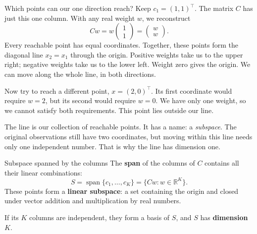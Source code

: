 \documentclass[a4paper,12pt,oneside]{report}
\begin{document}
\begin{framedexample}{Which points can our one direction reach?}
Keep $c_1=(1,1)^\top$. The matrix $C$ has just this one column.
With any real weight $w$, we reconstruct
\[
  Cw=w\begin{pmatrix}1\\1\end{pmatrix}
     =\begin{pmatrix}w\\w\end{pmatrix}.
\]
Every reachable point has equal coordinates. Together, these points
form the diagonal line $x_2=x_1$ through the origin.
Positive weights take us to the upper right; negative weights take
us to the lower left. Weight zero gives the origin. We can move
along the whole line, in both directions.

\begin{center}
\end{center}

Now try to reach a different point, $x=(2,0)^\top$.
Its first coordinate would require $w=2$, but its second would
require $w=0$. We have only one weight, so we cannot satisfy both
requirements. This point lies outside our line.
\end{framedexample}

The line is our collection of reachable points. It has a name:
a \emph{subspace}. The original observations still have two
coordinates, but moving within this line needs only one independent
number. That is why the line has dimension one.

\begin{frameddefn}{Subspace spanned by the columns}\label{def:column-subspace}
The \textbf{span} of the columns of $C$ contains all their linear combinations:
\[
  S=\operatorname{span}\{c_1,\ldots,c_K\}
   =\{Cw:w\in\mathbb{R}^K\}.
\]
These points form a \textbf{linear subspace}: a set containing the
origin and closed under vector addition and multiplication by real numbers.

If its $K$ columns are independent, they form a basis of $S$, and
$S$ has \textbf{dimension $K$}.
\end{frameddefn}
\end{document}
